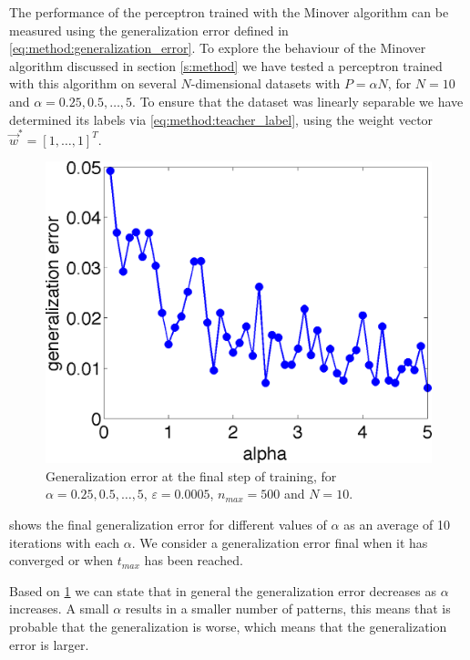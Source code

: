 The performance of the perceptron trained with the Minover algorithm can be measured using the generalization error defined in \autoref{eq:method:generalization_error}. To explore the behaviour of the Minover algorithm discussed in section \ref{s:method} we have tested a perceptron trained with this algorithm on several $N$-dimensional datasets with $P = \alpha N$, for $N = 10$ and $\alpha = 0.25, 0.5, \dotsc, 5$. To ensure that the dataset was linearly separable we have determined its labels via \eqref{eq:method:teacher_label}, using the weight vector $\vec{w}^* = [1, \dotsc, 1]^T$.\\

\begin{figure}
	\centering
	\includegraphics[width=0.9\columnwidth]{./img/finalgeneralizationerrors}
	\caption{Generalization error at the final step of training, for $\alpha = 0.25, 0.5, \dotsc, 5$, $\varepsilon = 0.0005$, $n_{max} = 500$ and $N = 10$.}
	\label{fig:exp:finalgeneralizationError}
\end{figure}

 shows the final generalization error for different values of $\alpha$ as an average of 10 iterations with each $\alpha$. We consider a generalization error final when it has converged or when $t_{max}$ has been reached. 

Based on \cref{fig:exp:finalgeneralizationError} we can state that in general the generalization error decreases as $\alpha$ increases. A small $\alpha$ results in a smaller number of patterns, this means that is probable that the generalization is worse, which means that the generalization error is larger.

